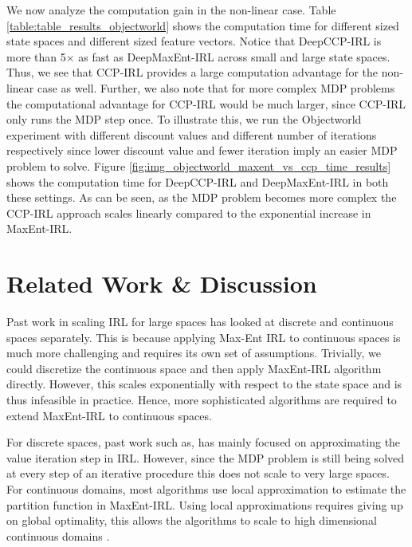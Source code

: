 \documentclass{article}
\begin{document}

We now analyze the computation gain in the non-linear case. Table \ref{table:table_results_objectworld} shows the computation time for different sized state spaces and different sized feature vectors. Notice that DeepCCP-IRL is more than 5$\times$ as fast as DeepMaxEnt-IRL across small and large state spaces. Thus, we see that CCP-IRL provides a large computation advantage for the non-linear case as well. Further, we also note that for more complex MDP problems the computational advantage for CCP-IRL would be much larger, since CCP-IRL only runs the MDP step once. To illustrate this, we run the Objectworld experiment with different discount values and different number of iterations respectively since lower discount value and fewer iteration imply an easier MDP problem to solve. Figure \ref{fig:img_objectworld_maxent_vs_ccp_time_results} shows the computation time for DeepCCP-IRL and DeepMaxEnt-IRL in both these settings. As can be seen, as the MDP problem becomes more complex the CCP-IRL approach scales linearly compared to the exponential increase in MaxEnt-IRL.




\section{Related Work \& Discussion}

Past work in scaling IRL for large spaces has looked at discrete and continuous spaces separately. This is because applying Max-Ent IRL to continuous spaces is much more challenging and requires its own set of assumptions. Trivially, we could discretize the continuous space and then apply MaxEnt-IRL algorithm directly. However, this scales exponentially with respect to the state space and is thus infeasible in practice. Hence, more sophisticated algorithms are required to extend MaxEnt-IRL to continuous spaces. 

For discrete spaces, past work such as, \cite{huang2015approximate} has mainly focused on approximating the value iteration step in IRL. However, since the MDP problem is still being solved at every step of an iterative procedure this does not scale to very large spaces. For continuous domains, most algorithms use local approximation to estimate the partition function in MaxEnt-IRL. Using local approximations requires giving up on global optimality, this allows the algorithms to scale to high dimensional continuous domains \cite{levine2012continuous, kalakrishnan2013learning, finn2016guided}.
\end{document}
